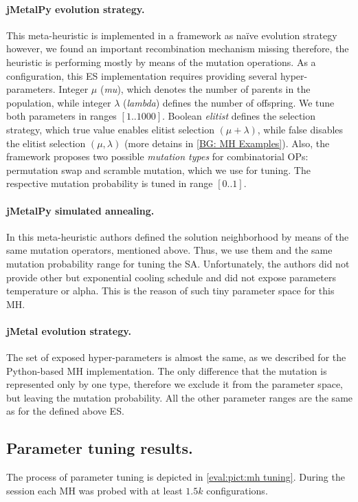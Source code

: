 \paragraph{jMetalPy evolution strategy.} This meta-heuristic is implemented in a framework as na\"ive evolution strategy however, we found an important recombination mechanism missing therefore, the heuristic is performing mostly by means of the mutation operations. As a configuration, this ES implementation requires providing several hyper-parameters. Integer $\mu$ (\emph{mu}), which denotes the number of parents in the population, while integer $\lambda$ (\emph{lambda}) defines the number of offspring. We tune both parameters in ranges $[1..1000]$. Boolean \emph{elitist} defines the selection strategy, which true value enables elitist selection $(\mu+\lambda)$, while false disables the elitist selection $(\mu,\lambda)$ (more detains in \cref{BG: MH Examples}). Also, the framework proposes two possible \emph{mutation types} for combinatorial OPs: permutation swap and scramble mutation, which we use for tuning. The respective mutation probability is tuned in range $[0..1]$.

\paragraph{jMetalPy simulated annealing.} In this meta-heuristic authors defined the solution neighborhood by means of the same mutation operators, mentioned above. Thus, we use them and the same mutation probability range for tuning the SA. Unfortunately, the authors did not provide other but exponential cooling schedule and did not expose parameters temperature or alpha. This is the reason of such tiny parameter space for this MH.

\paragraph{jMetal evolution strategy.} The set of exposed hyper-parameters is almost the same, as we described for the Python-based MH implementation. The only difference that the mutation is represented only by one type, therefore we exclude it from the parameter space, but leaving the mutation probability. All the other parameter ranges are the same as for the defined above ES.


\subsection{Parameter tuning results.} 
The process of parameter tuning is depicted in \cref{eval:pict:mh tuning}. During the session each MH was probed with at least $1.5k$ configurations. 


